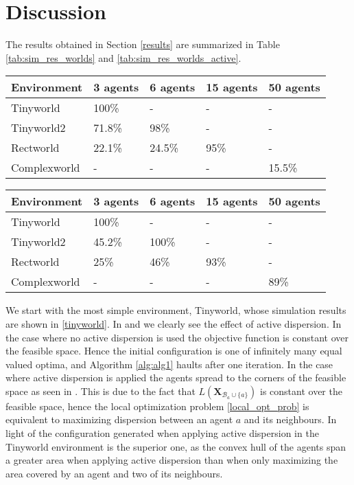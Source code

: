 \section{Discussion}
The results obtained in Section \ref{results} are summarized in Table \ref{tab:sim_res_worlds} and \ref{tab:sim_res_worlds_active}.
\begin{center}
  \begin{tabular}{l|l|l|l|l}
    Environment & 3 agents & 6 agents & 15 agents & 50 agents\\
    \hline
    Tinyworld & 100\% & - & - & - \\ 
    Tinyworld2 & 71.8\% & 98\% & - & - \\
    Rectworld &  22.1\% & 24.5\% & 95\% & - \\
    Complexworld & - & - & - & 15.5\% \\
  \end{tabular}
\end{center}
\begin{center}
  \begin{tabular}{l|l|l|l|l}
    Environment & 3 agents & 6 agents & 15 agents & 50 agents\\
    \hline
    Tinyworld & 100\% & - & - & - \\ 
    Tinyworld2 & 45.2\% & 100\% & - & - \\
    Rectworld &  25\% & 46\% & 93\% & - \\
    Complexworld & - & - & - & 89\% \\
  \end{tabular}
\end{center}

We start with the most simple environment, Tinyworld, whose simulation results are shown in \ref{tinyworld}. In  and  we clearly see the 
effect of active dispersion. In the case where no active dispersion is used the objective function is constant over the feasible space. Hence the initial configuration is one of 
infinitely many equal valued optima, and Algorithm \ref{alg:alg1} haults after one iteration. In the case where active dispersion is applied the agents spread to the corners of the
feasible space as seen in . This is due to the fact that $L(\mathbf{X}_{\mathcal{B}_{a}\cup\{a\}})$ is constant over the feasible space, hence the 
local optimization problem \eqref{local_opt_prob} is equivalent to maximizing dispersion between an agent $a$ and its neighbours. In light of \cite{CRB_multilat} the configuration generated
when applying active dispersion in the Tinyworld environment is the superior one, as the convex hull of the agents span a greater area when applying active dispersion than when only maximizing the area covered
by an agent and two of its neighbours.

